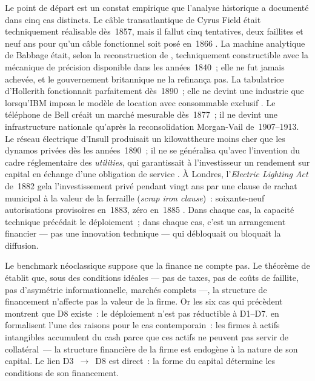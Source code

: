 Le point de départ est un constat empirique que l'analyse historique a documenté dans cinq cas distincts. Le câble transatlantique de Cyrus Field était techniquement réalisable dès~1857, mais il fallut cinq tentatives, deux faillites et neuf ans pour qu'un câble fonctionnel soit posé en~1866 \parencite{gordon_thread_2002}. La machine analytique de Babbage était, selon la reconstruction de \textcite{swade_difference_2001}, techniquement constructible avec la mécanique de précision disponible dans les années~1840~; elle ne fut jamais achevée, et le gouvernement britannique ne la refinança pas. La tabulatrice d'Hollerith fonctionnait parfaitement dès~1890~; elle ne devint une industrie que lorsqu'IBM imposa le modèle de location avec consommable exclusif \parencite{cortada_before_1993}. Le téléphone de Bell créait un marché mesurable dès~1877~; il ne devint une infrastructure nationale qu'après la reconsolidation Morgan-Vail de~1907--1913. Le réseau électrique d'Insull produisait un kilowattheure moins cher que les dynamos privées dès les années~1890~; il ne se généralisa qu'avec l'invention du cadre réglementaire des \emph{utilities}, qui garantissait à l'investisseur un rendement sur capital en échange d'une obligation de service \parencite{hughes_networks_1983}. À Londres, l'\emph{Electric Lighting Act} de~1882 gela l'investissement privé pendant vingt ans par une clause de rachat municipal à la valeur de la ferraille (\emph{scrap iron clause})~: soixante-neuf autorisations provisoires en~1883, zéro en~1885 \parencite{hughes_networks_1983}. Dans chaque cas, la capacité technique précédait le déploiement~; dans chaque cas, c'est un arrangement financier --- pas une innovation technique --- qui débloquait ou bloquait la diffusion.

\markNEO Le benchmark néoclassique suppose que la finance ne compte pas. Le théorème de \textcite{modigliani_cost_1958} établit que, sous des conditions idéales --- pas de taxes, pas de coûts de faillite, pas d'asymétrie informationnelle, marchés complets ---, la structure de financement n'affecte pas la valeur de la firme.  Or les six cas qui précèdent montrent que D8 existe~: le déploiement n'est pas réductible à D1--D7. \textcite{falato_intangible_2022} en formalisent l'une des raisons pour le cas contemporain~: les firmes à actifs intangibles accumulent du cash parce que ces actifs ne peuvent pas servir de collatéral~--- la structure financière de la firme est endogène à la nature de son capital. Le lien D3~$\to$~D8 est direct~: la forme du capital détermine les conditions de son financement.

